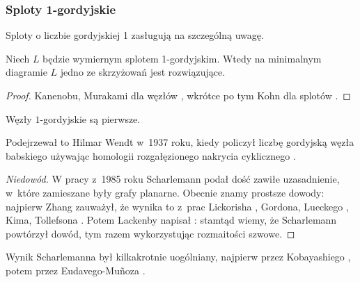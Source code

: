 
\subsubsection{Sploty 1-gordyjskie}
Sploty o liczbie gordyjskiej 1 zasługują na szczególną uwagę.

\begin{proposition}
%
    Niech $L$ będzie wymiernym splotem 1-gordyjskim.
    Wtedy na minimalnym diagramie $L$ jedno ze skrzyżowań jest rozwiązujące.
\end{proposition}

\begin{proof}
%
%
%
    Kanenobu, Murakami dla węzłów \cite{kanenobumurakami86}, wkrótce po tym Kohn dla splotów \cite{kohn91}.
\end{proof}

\begin{proposition}
\label{prp:unknotting_one_prime}%
    Węzły $1$-gordyjskie są pierwsze.
\end{proposition}

Podejrzewał to Hilmar Wendt w~1937 roku, kiedy policzył liczbę gordyjską węzła babskiego używając homologii rozgałęzionego nakrycia cyklicznego \cite{wendt37}.
%

\begin{proof}[Niedowód]
    W pracy \cite{scharlemann85} z~1985 roku Scharlemann podał dość zawiłe uzasadnienie, w~które zamieszane były grafy planarne.
%
    Obecnie znamy prostsze dowody: najpierw Zhang \cite{zhang91} zauważył, że wynika to z~prac Lickorisha \cite{lickorish85}, Gordona, Lueckego \cite{luecke87}, Kima, Tollefsona \cite{tollefson80}.
%
%
%
%
%
%
    Potem Lackenby napisał \cite{lackenby97}: stamtąd wiemy, że Scharlemann powtórzył dowód, tym razem wykorzystując rozmaitości szwowe.
%
%
\end{proof}

Wynik Scharlemanna był kilkakrotnie uogólniany, najpierw przez Kobayashiego \cite{kobayashi989}, potem przez Eudavego-Muñoza \cite{eudave95}.
%
%

